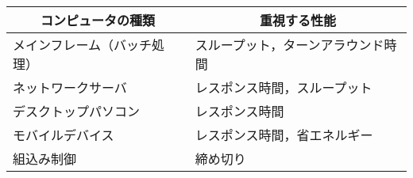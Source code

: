 \documentclass[dvipdfmx]{standalone}
\begin{document}
\small
\begin{tabular}{l|l}
\hline\hline
\multicolumn{1}{c}{コンピュータの種類} & \multicolumn{1}{|c}{重視する性能} \\
\hline
メインフレーム（バッチ処理）       & スループット，ターンアラウンド時間 \\
ネットワークサーバ                 & レスポンス時間，スループット \\
デスクトップパソコン               & レスポンス時間 \\
モバイルデバイス                   & レスポンス時間，省エネルギー \\
組込み制御                         & 締め切り \\
\end{tabular}~
\end{document}
